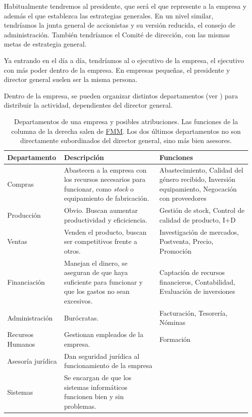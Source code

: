 \documentclass[nochap,palatino,shortheader]{apuntes}
\begin{document}
Habitualmente tendremos al presidente, que será el que represente a la empresa y además el que establezca las estrategias generales. En un nivel similar, tendríamos la junta general de accionistas y su versión reducida, el consejo de administración. También tendríamos el Comité de dirección, con las mismas metas de estrategia general.

Ya entrando en el día a día, tendríamos al  o ejecutivo de la empresa, el ejecutivo con más poder dentro de la empresa. En empresas pequeñas, el presidente y director general suelen ser la misma persona.

Dentro de la empresa, se pueden organizar distintos departamentos (ver ) para distribuir la actividad, dependientes del director general.

\begin{table}[hbtp]
\centering
\begin{tabular}{l|p{5cm}|p{5cm}}
\textbf{Departamento} & \textbf{Descripción} & \textbf{Funciones} \\ \toprule
Compras & Abastecen a la empresa con los recursos necesarios para funcionar, como \textit{stock} o equipamiento de fabricación. & Abastecimiento, Calidad del género recibido, Inversión equipamiento, Negocación con proveedores \\ \midrule

Producción & Obvio. Buscan aumentar productividad y eficiciencia. & Gestión de stock, Control de calidad de producto, I+D \\ \midrule

Ventas & Venden el producto, buscan ser competitivos frente a otros. & Investigación de mercados, Postventa, Precio, Promoción \\ \midrule

Financiación & Manejan el dinero, se aseguran de que haya suficiente para funcionar y que los gastos no sean excesivos. & Captación de recursos financieros, Contabilidad, Evaluación de inversiones \\ \midrule

Administración & Burócratas. & Facturación, Tesorería, Nóminas \\ \midrule

Recursos Humanos & Gestionan empleados de la empresa. & Formación\\ \midrule \midrule
Asesoría jurídica & Dan seguridad jurídica al funcionamiento de la empresa & \\ \midrule
Sistemas & Se encargan de que los sistemas informáticos funcionen bien y sin problemas. & \\
\end{tabular}
\caption{Departamentos de una empresa y posibles atribuciones. Las funciones de la columna de la derecha salen de \href{http://maestremiranda.com/techdir/wp-content/uploads/2015/10/Organizacion2.pdf}{FMM}. Los dos últimos departamentos no son directamente subordinados del director general, sino más bien asesores.}
\label{tab:Organizacion}
\end{table}
\end{document}
